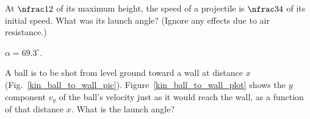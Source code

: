 \begin{problem}
	At $\nfrac12$ of its maximum height, the speed of a projectile is $\nfrac34$
	of its initial speed. What was its launch angle? (Ignore any effects
	due to air resistance.)
	\begin{solution}
		$\alpha =69.3^\circ$.
	\end{solution}
\end{problem}


\begin{problem}\label{prb:kin_ball_to_wall}
	A ball is to be shot from level ground toward a wall at distance $x$ (Fig.~\ref{kin_ball_to_wall_pic}). Figure~\ref{kin_ball_to_wall_plot} shows the $y$ component $v_y$ of the ball’s velocity just as it would reach the wall, as a function of that distance $x$. What is the launch angle?
\begin{figure}[h!]\centering
	\begin{subfigure}[t]{0.45\linewidth}\centering
\end{subfigure}
\end{figure}
\end{problem}

